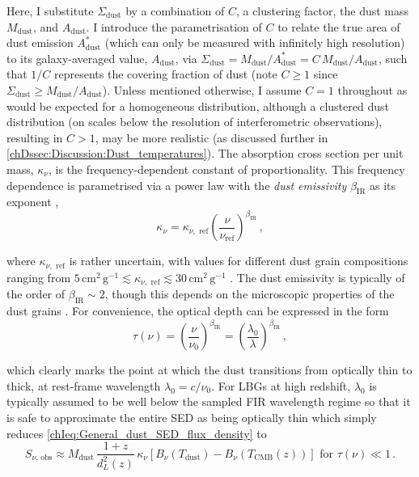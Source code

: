 Here, I substitute $\Sigma_\text{dust}$ by a combination of $C$, a clustering factor, the dust mass $M_\text{dust}$, and $A_\text{dust}$. I introduce the parametrisation of $C$ to relate the true area of dust emission $A_\text{dust}^*$ (which can only be measured with infinitely high resolution) to its galaxy-averaged value, $A_\text{dust}$, via $\Sigma_\text{dust} = M_\text{dust} / A_\text{dust}^* = C \, M_\text{dust} / A_\text{dust}$, such that $1/C$ represents the covering fraction of dust (note $C \geq 1$ since $\Sigma_\text{dust} \geq M_\text{dust} / A_\text{dust}$). Unless mentioned otherwise, I assume $C = 1$ throughout as would be expected for a homogeneous distribution, although a clustered dust distribution (on scales below the resolution of interferometric observations), resulting in $C > 1$, may be more realistic (as discussed further in \cref{chDssec:Discussion:Dust_temperatures}). The absorption cross section per unit mass, $\kappa_\nu$, is the frequency-dependent constant of proportionality. This frequency dependence is parametrised via a power law with the \textit{dust emissivity} $\beta_\text{IR}$ as its exponent \citep{2006ApJ...636.1114D},
\begin{equation}
    \label{chIeq:Dust_mass_absorption_coefficient_form}
    \kappa_\nu = \kappa_{\nu, \text{ ref}} \left( \frac{\nu}{\nu_\text{ref}} \right)^{\beta_\text{IR}} \, ,
\end{equation}

\noindent where $\kappa_{\nu, \text{ ref}}$ is rather uncertain, with values for different dust grain compositions ranging from $5 \, \mathrm{cm^2 \, g^{-1}} \lesssim \kappa_{\nu, \text{ ref}} \lesssim 30 \, \mathrm{cm^2 \, g^{-1}}$ \citep[see][, and references therein]{2014MNRAS.443.1704H}. The dust emissivity is typically of the order of $\beta_\text{IR} \sim 2$, though this depends on the microscopic properties of the dust grains \citep{2013A&A...560A..91J}. For convenience, the optical depth can be expressed in the form
\begin{equation}
    \label{chIeq:Optical_depth}
    \tau (\nu) = \left( \frac{\nu}{\nu_0} \right)^{\beta_\text{IR}} = \left( \frac{\lambda_0}{\lambda} \right)^{\beta_\text{IR}} \, ,
\end{equation}

\noindent which clearly marks the point at which the dust transitions from optically thin to thick, at rest-frame wavelength $\lambda_0 = c/\nu_0$. For LBGs at high redshift, $\lambda_0$ is typically assumed to be well below the sampled FIR wavelength regime so that it is safe to approximate the entire SED as being optically thin \citep[e.g.][]{2021MNRAS.508L..58B} which simply reduces \cref{chIeq:General_dust_SED_flux_density} to
\begin{equation}
    \label{chIeq:OT_dust_SED_flux_density}
    S_{\nu, \, \text{obs}} \approx M_\text{dust} \, \frac{1+z}{d_L^2 (z)} \, \kappa_\nu \left[ B_\nu \left(T_\text{dust} \right) - B_\nu \left(T_\text{CMB} (z) \right) \right] \text{ for } \tau (\nu) \ll 1 \, .
\end{equation}

